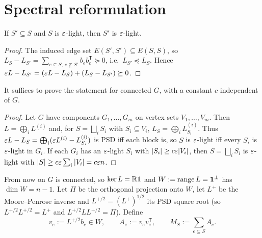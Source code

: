 \section{Spectral reformulation}\label{sec:reform}

\begin{lemma}[Monotonicity]\label{lem:mono}
If $S'\subseteq S$ and $S$ is $\varepsilon$-light, then $S'$ is $\varepsilon$-light.
\end{lemma}
\begin{proof}
The induced edge set $E(S',S')\subseteq E(S,S)$, so
$L_S-L_{S'}=\sum_{e\subseteq S,\ e\not\subseteq S'}b_eb_e^{\mathsf T}\succeq 0$, i.e.\ $L_{S'}\preceq L_S$.
Hence $\varepsilon L-L_{S'}=(\varepsilon L-L_S)+(L_S-L_{S'})\succeq 0$.
\end{proof}

\begin{lemma}\label{lem:conn}
It suffices to prove the statement for connected $G$, with a constant $c$ independent of $G$.
\end{lemma}
\begin{proof}
Let $G$ have components $G_1,\dots,G_m$ on vertex sets $V_1,\dots,V_m$. Then $L=\bigoplus_i L^{(i)}$
and, for $S=\bigsqcup_i S_i$ with $S_i\subseteq V_i$, $L_S=\bigoplus_i L^{(i)}_{S_i}$.
Thus $\varepsilon L-L_S=\bigoplus_i(\varepsilon L^{(i)}-L^{(i)}_{S_i})$ is PSD iff each block is, so $S$ is
$\varepsilon$-light iff every $S_i$ is $\varepsilon$-light in $G_i$. If each $G_i$ has an $\varepsilon$-light
$S_i$ with $|S_i|\ge c\varepsilon|V_i|$, then $S=\bigsqcup_i S_i$ is $\varepsilon$-light with
$|S|\ge c\varepsilon\sum_i|V_i|=c\varepsilon n$.
\end{proof}

From now on $G$ is connected, so $\ker L=\mathbb{R}\mathbf 1$ and $W:=\operatorname{range} L=\mathbf 1^{\perp}$ has
$\dim W=n-1$. Let $\Pi$ be the orthogonal projection onto $W$, let $L^{+}$ be the Moore--Penrose
inverse and $L^{+/2}=(L^{+})^{1/2}$ its PSD square root (so $L^{+/2}L^{+/2}=L^{+}$ and
$L^{+/2}LL^{+/2}=\Pi$). Define
\[
v_e:=L^{+/2}b_e\in W,\qquad A_e:=v_ev_e^{\mathsf T},\qquad M_S:=\sum_{e\subseteq S}A_e .
\]

